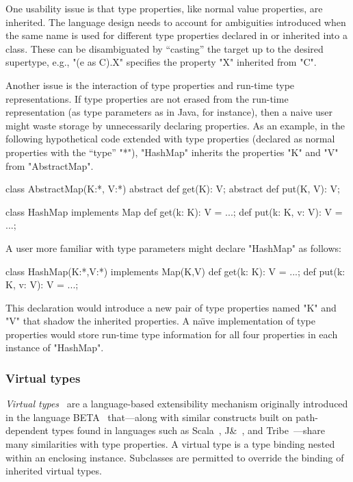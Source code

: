 One usability issue is that
type properties, like normal value properties, are inherited.
The language design needs
to account for ambiguities introduced when the same name is
used for different type properties declared in or inherited into a class.
These can be disambiguated
by ``casting'' the target up to the desired supertype,
e.g., \xcd"(e as C).X" specifies
the property \xcd"X" inherited from \xcd"C".

Another issue is the interaction of type properties and run-time
type representations.  If type properties are not erased from
the run-time representation (as
type parameters as in Java, for instance), then a naive user
might waste storage by unnecessarily declaring properties.
As an example, in the following hypothetical code extended with
type properties (declared as normal properties with the ``type''
\xcd"*"),
\xcd"HashMap"  inherits the properties \xcd"K" and \xcd"V" from
\xcd"AbstractMap".
\begin{xten}
class AbstractMap(K:*, V:*) {
  abstract def get(K): V;
  abstract def put(K, V): V;
}

class HashMap implements Map {
  def get(k: K): V = ...;
  def put(k: K, v: V): V = ...;
}
\end{xten}
A user more familiar with type parameters might declare
\xcd"HashMap" as follows:
\begin{xten}
class HashMap(K:*,V:*) implements Map(K,V) {
  def get(k: K): V = ...;
  def put(k: K, v: V): V = ...;
}
\end{xten}
This declaration would introduce a new pair of type properties
named \xcd"K" and
\xcd"V" that shadow the inherited properties.
A na{\"\i}ve implementation of type properties would store run-time
type information for all four properties in each instance
of \xcd"HashMap".


\subsubsection{Virtual types}

\emph{Virtual types}~\cite{beta,mp89-virtual-classes,ernst06-virtual}
are a language-based extensibility
mechanism 
originally introduced in the language
BETA~\cite{beta} that---along with
similar constructs built on path-dependent types found in
languages such as Scala~\cite{scala}, J\&~\cite{nqm06},
and Tribe~\cite{cdnw07-tribe}---share many similarities with type properties.
A virtual type is a type binding nested within an enclosing instance.
Subclasses are permitted to override the binding of inherited virtual types. 

